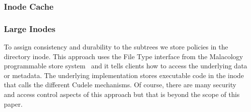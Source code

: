 \subsubsection{Inode Cache}

\subsubsection{Large Inodes}

To assign consistency and durability to the subtrees we store policies in
the directory inode. This approach uses the File Type interface from the
Malacology programmable store system~\cite{sevilla:eurosys17} and it tells clients how to access
the underlying data or metadata. The underlying implementation stores
executable code in the inode that calls the different Cudele mechanisms. Of
course, there are many security and access control aspects of this approach but
that is beyond the scope of this paper.





%


